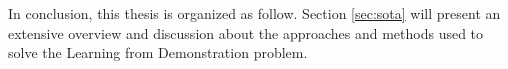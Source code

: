 In conclusion, this thesis is organized as follow. Section \ref{sec:sota} will present an extensive overview and discussion about the approaches and methods used to solve the Learning from Demonstration problem.

